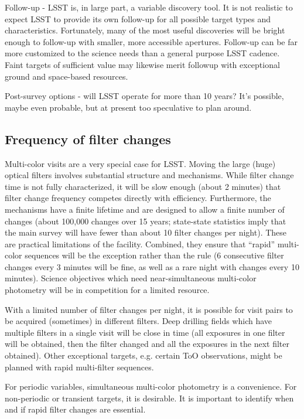 Follow-up - LSST is, in large part, a variable discovery tool.  It is
not realistic to expect LSST to provide its own follow-up for all
possible target types and characteristics. Fortunately, many of the most
useful discoveries will be bright enough to follow-up with smaller, more
accessible apertures.  Follow-up can be far more customized to the
science needs than a general purpose LSST cadence.  Faint targets of
sufficient value may likewise merit followup with exceptional  ground
and space-based resources.

Post-survey options - will LSST operate for more than 10 years? It's
possible, maybe even probable, but at present too speculative to plan
around.

\subsection{Frequency of filter changes}

Multi-color visits are a very special case for LSST.  Moving the large
(huge) optical filters involves substantial structure and mechanisms.
While filter change time is not fully characterized, it will be slow
enough (about 2 minutes) that filter change frequency competes directly with efficiency.
Furthermore, the mechanisms have a finite lifetime and are designed
to allow a finite number of changes (about 100,000 changes over 15 years;
state-state statistics imply that the main survey will have fewer than
about 10 filter changes per night). These are practical
limitations of the facility. Combined, they ensure that ``rapid''
multi-color sequences will be the exception rather than the rule
(6 consecutive filter changes every 3 minutes will be fine, as well as
a rare night with changes every 10 minutes).
Science objectives which need near-simultaneous multi-color photometry
will be in competition for a limited resource.

With a limited number of filter changes per night, it is possible for
visit pairs to be acquired (sometimes) in different filters.  Deep
drilling fields which have multiple filters in a single visit will be
close in time (all exposures in one filter will be obtained, then the
filter changed and all the exposures in the next filter obtained).
Other exceptional targets, e.g. certain ToO observations, might be
planned with rapid multi-filter sequences.

For periodic variables, simultaneous multi-color photometry is a
convenience.  For non-periodic or transient targets, it is desirable. It
is important to identify when and if rapid filter changes are essential.

